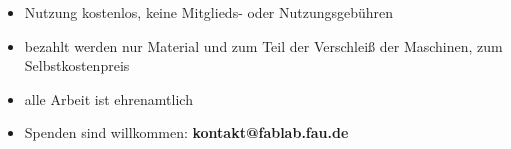\begin{itemize}
  \item Nutzung kostenlos, keine Mitglieds- oder Nutzungsgebühren
  \item bezahlt werden nur Material und zum Teil der Verschleiß der
    Maschinen, zum Selbstkostenpreis
  \item alle Arbeit ist ehrenamtlich
  \item Spenden sind willkommen: \textbf{\mbox{kontakt@fablab.fau.de}}
\end{itemize}
